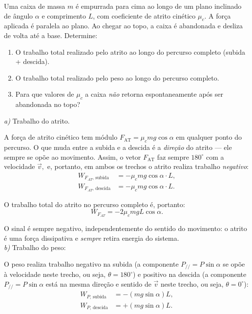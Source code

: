 \begin{exemplo}\label{exemplo_energia_trabalhoex03}

Uma caixa de massa $m$ é empurrada para cima ao longo de um plano inclinado de
ângulo $\alpha$ e comprimento $L$, com coeficiente de atrito cinético $\mu_c$.
A força aplicada é paralela ao plano. Ao chegar ao topo, a caixa é abandonada e
desliza de volta até a base. Determine:
\begin{enumerate}
    \item [a)] O trabalho total realizado pelo atrito ao longo do percurso completo
    (subida + descida).
    \item [b)] O trabalho total realizado pelo peso ao longo do percurso completo.
    \item [c)] Para que valores de $\mu_c$ a caixa \emph{não} retorna espontaneamente
    após ser abandonada no topo?
\end{enumerate}

\resolucao

\textit{a)} Trabalho do atrito.
 
A força de atrito cinético tem módulo $F_\text{AT} = \mu_c mg\cos\alpha$ em qualquer ponto
do percurso. O que muda entre a subida e a descida é a \textit{direção} do atrito
--- ele sempre se opõe ao movimento. Assim, o vetor $F_\text{AT}$ faz sempre $180^\circ$ com a velocidade $\vec v,$ e, portanto, em ambos os trechos o atrito realiza trabalho
\textit{negativo}:
%
\begin{align*}
    W_{F_{AT},\,\text{subida}}  &= -\mu_c mg\cos\alpha \cdot L, \\
    W_{F_{AT},\,\text{descida}} &= -\mu_c mg\cos\alpha \cdot L.
\end{align*}
 
O trabalho total do atrito no percurso completo é, portanto:
%
\begin{equation*}
     \boxed{W_{F_{AT}} =-2\mu_c mgL\cos\alpha.}
\end{equation*}
 
O sinal é sempre negativo, independentemente do sentido do movimento: o atrito é
uma força dissipativa e \textit{sempre} retira energia do sistema. \\
 
\textit{b)} Trabalho do peso:
 
O peso realiza trabalho negativo na subida (a componente $P_{//} = P \sin \alpha$ se opõe à velocidade neste trecho, ou seja, $\theta = 180^\circ$) e positivo na descida (a componente $P_{//} = P \sin \alpha$ está na mesma direção e sentido de $\vec v$ neste trecho, ou seja, $\theta = 0^\circ$):
%
\begin{align*}
    W_{P,\,\text{subida}}  &= -(mg \sin\alpha )L, \\
    W_{P,\,\text{descida}} &= + (mg \sin\alpha)L.
\end{align*}
 

\end{exemplo}
